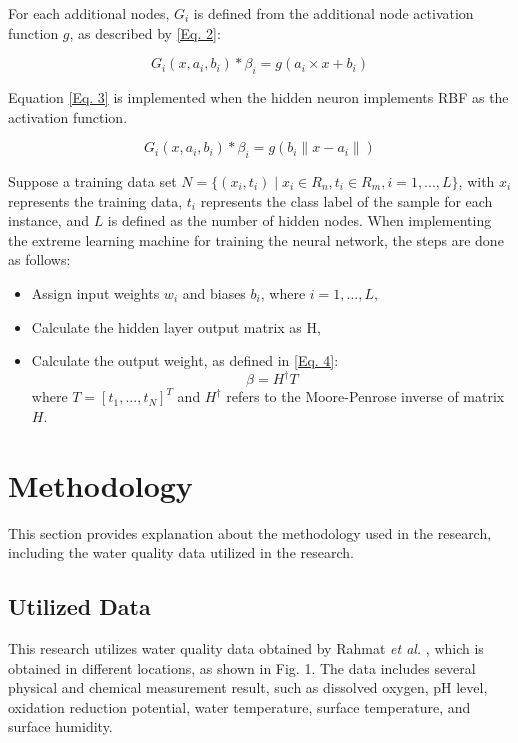 \documentclass[journal,comsoc]{IEEEtran}
\begin{document}
For each additional nodes, $G_{i}$ is defined from the additional node activation function $g$, as described by \eqref{Eq. 2}:

\begin{equation}
G_{i} (x, a_{i}, b_{i}) * \beta_{i} = g(a_{i} \times x + b_{i})\label{Eq. 2}
\end{equation}

Equation \eqref{Eq. 3} is implemented when the hidden neuron implements RBF as the activation function.

\begin{equation}
G_{i}(x, a_{i}, b_{i}) * \beta_{i} = g(b_{i}\parallel x - a_{i} \parallel)\label{Eq. 3}
\end{equation}

Suppose a training data set $ N = \{(x_{i},t_{i}) \mid x_{i} \in R_{n}, t_{i} \in R_{m}, i = 1, ..., L\}$, with $x_{i}$ represents the training data, $t_{i}$ represents the class label of the sample for each instance, and $L$ is defined as the number of hidden nodes. When implementing the extreme learning machine for training the neural network, the steps are done as follows:

\begin{itemize}
\item Assign input weights $w_{i}$ and biases $b_{i}$, where $i = 1, ..., L$,
\item Calculate the hidden layer output matrix as H,
\item Calculate the output weight, as defined in \eqref{Eq. 4}:
\begin{equation}
\beta = H^\dagger T\label{Eq. 4}
\end{equation}
where $T = [t_{1},...,t_{N}]^T$ and $H^\dagger$ refers to the Moore-Penrose inverse of matrix $H$.
\end{itemize}

\section{Methodology}

This section provides explanation about the methodology used in the research, including the water quality data utilized in the research.

\subsection{Utilized Data}

This research utilizes water quality data obtained by Rahmat {\it et al.} \cite{Rahmat16}, which is obtained in different locations, as shown in Fig. 1. The data includes several physical and chemical measurement result, such as dissolved oxygen, pH level, oxidation reduction potential, water temperature, surface temperature, and surface humidity.
\end{document}
